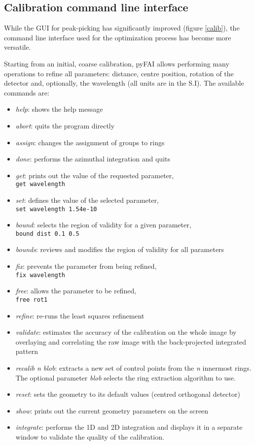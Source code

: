 \documentclass{iucr}
\begin{document}
\subsection{Calibration command line interface}

While the GUI for peak-picking has significantly improved
(figure \ref{calib}), the command line interface used for the optimization
process has become more versatile.

Starting from an initial, coarse calibration, pyFAI allows performing many
operations to refine all parameters: distance, centre position, rotation of
the detector and, optionally, the wavelength (all units are in the S.I).
The available commands are:
\begin{itemize}
\item \textit{help}: shows the help message
\item \textit{abort}: quits the program directly
\item \textit{assign}: changes the assignment of groups to rings
\item \textit{done}: performs the azimuthal integration and quits
\item \textit{get}: prints out the value of the requested parameter, \\
	\verb|get wavelength|
\item \textit{set}: defines the value of the selected parameter,\\
	\verb|set wavelength 1.54e-10|
\item \textit{bound}: selects the region of validity for a given parameter,\\
	\verb|bound dist 0.1 0.5|
\item \textit{bounds}: reviews and modifies the region of validity for all
parameters
\item \textit{fix}: prevents the parameter from being refined,\\
	\verb|fix wavelength|
\item \textit{free}: allows the parameter to be refined,\\ 
	\verb|free rot1|
\item \textit{refine}: re-runs the least squares refinement
\item \textit{validate}: estimates the accuracy of the calibration on
the whole image by overlaying and correlating the raw image with the
back-projected integrated pattern
\item \textit{recalib n blob}: extracts a new set of control points from the
\textit{n} innermost rings. The optional parameter \textit{blob}
selects the ring extraction algorithm to use.
\item \textit{reset}: sets the geometry to its default values (centred
orthogonal detector)
\item \textit{show}: prints out the current geometry parameters on the screen
\item \textit{integrate}: performs the 1D and 2D integration and displays it in
a separate window to validate the quality of the calibration.
\end{itemize}
\end{document}
